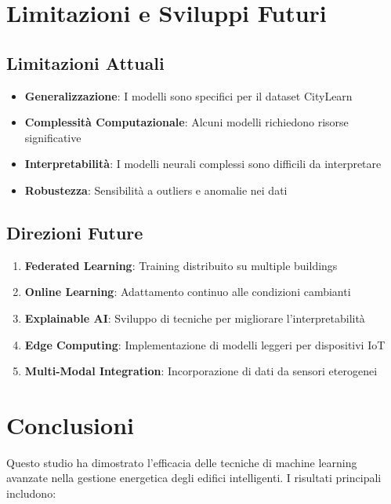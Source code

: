 \documentclass[11pt,a4paper]{article}
\begin{document}
\section{Limitazioni e Sviluppi Futuri}

\subsection{Limitazioni Attuali}
\begin{itemize}
    \item \textbf{Generalizzazione}: I modelli sono specifici per il dataset CityLearn
    \item \textbf{Complessità Computazionale}: Alcuni modelli richiedono risorse significative
    \item \textbf{Interpretabilità}: I modelli neurali complessi sono difficili da interpretare
    \item \textbf{Robustezza}: Sensibilità a outliers e anomalie nei dati
\end{itemize}

\subsection{Direzioni Future}
\begin{enumerate}
    \item \textbf{Federated Learning}: Training distribuito su multiple buildings
    \item \textbf{Online Learning}: Adattamento continuo alle condizioni cambianti
    \item \textbf{Explainable AI}: Sviluppo di tecniche per migliorare l'interpretabilità
    \item \textbf{Edge Computing}: Implementazione di modelli leggeri per dispositivi IoT
    \item \textbf{Multi-Modal Integration}: Incorporazione di dati da sensori eterogenei
\end{enumerate}

\section{Conclusioni}

Questo studio ha dimostrato l'efficacia delle tecniche di machine learning avanzate nella gestione energetica degli edifici intelligenti. I risultati principali includono:
\end{document}
